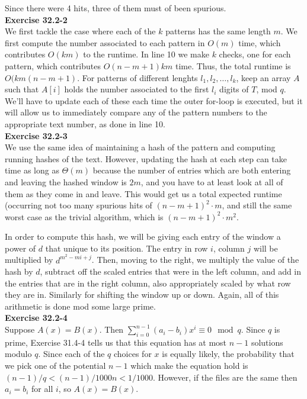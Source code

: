 \documentclass{article}
\begin{document}
Since there were 4 hits, three of them must of been spurious.\\

\noindent\textbf{Exercise 32.2-2}\\

We first tackle the case where each of the $k$ patterns has the same length $m$.  We first compute the number associated to each pattern in $O(m)$ time, which contributes $O(km)$ to the runtime.  In line 10 we make $k$ checks, one for each pattern, which contributes $O(n-m+1)km$ time.  Thus, the total runtime is $O(km(n-m+1)$. For patterns of different lenghts $l_1, l_2, \ldots, l_k$, keep an array $A$ such that $A[i]$ holds the number associated to the first $l_i$ digits of $T$, mod $q$.  We'll have to update each of these each time the outer for-loop is executed, but it will allow us to immediately compare any of the pattern numbers to the appropriate text number, as done in line 10. \\

\noindent\textbf{Exercise 32.2-3}\\

We use the same idea of maintaining a hash of the pattern and computing running hashes of the text. However, updating the hash at each step can take time as long as $\Theta(m)$ because the number of entries which are both entering and leaving the hashed window is $2m$, and you have to at least look at all of them as they come in and leave. This would get us a total expected runtime (occurring not too many spurious hits of $(n-m+1)^2\cdot m$, and still the same worst case as the trivial algorithm, which is $(n-m+1)^2 \cdot m^2$.

In order to compute this hash, we will be giving each entry of the window a power of $d$ that unique to its position. The entry in row $i$, column $j$ will be multiplied by $d^{m^2 - mi + j}$. Then, moving to the right, we multiply the value of the hash by $d$, subtract off the scaled entries that were in the left column, and add in the entries that are in the right column, also appropriately scaled by what row they are in. Similarly for shifting the window up or down. Again, all of this arithmetic is done mod some large prime.\\

\noindent\textbf{Exercise 32.2-4}\\

Suppose $A(x) = B(x)$.  Then $\sum_{i=0}^{n-1}(a_i-b_i)x^i \equiv 0 \mod q$.  Since $q$ is prime, Exercise 31.4-4 tells us that this equation has at most $n-1$ solutions modulo $q$. Since each of the $q$ choices for $x$ is equally likely, the probability that we pick one of the potential $n-1$ which make the equation hold is $(n-1)/q < (n-1)/1000n < 1/1000$. However, if the files are the same then $a_i = b_i$ for all $i$, so $A(x) = B(x)$. \\
\end{document}
